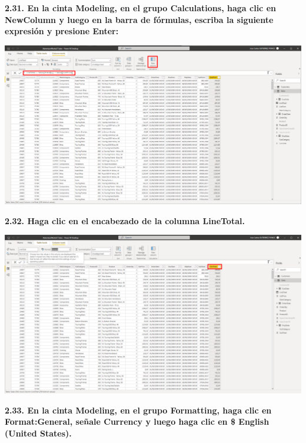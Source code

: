 \documentclass{article}
\begin{document}
\textbf{2.31. En la cinta \textbf{Modeling}, en el grupo \textbf{Calculations}, haga clic en \textbf{NewColumn} y luego en la barra de fórmulas, escriba la siguiente expresión y presione Enter:}

    \begin{center}
		\includegraphics[width=14cm]{./images/43} 
	\end{center}
\newpage	
\textbf{2.32. Haga clic en el encabezado de la columna \textbf{LineTotal}.}

    \begin{center}
		\includegraphics[width=14cm]{./images/44} 
	\end{center}
	
\textbf{2.33. En la cinta \textbf{Modeling}, en el grupo \textbf{Formatting}, haga clic en \textbf{Format:General}, señale \textbf{Currency} y luego haga clic en \textbf{\$ English (United States)}.}
\end{document}
